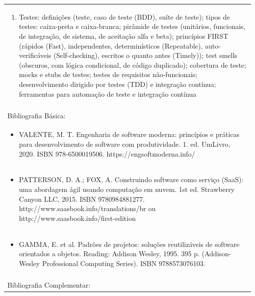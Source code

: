 \documentclass[11pt]{article}
\begin{document}
\begin{center}
\begin{longtable}{|p{4cm}|p{4cm}|p{4cm}|p{4cm}|}
\multicolumn{4}{|p{\dimexpr 16cm + 6\tabcolsep\relax}|}{\begin{enumerate}[start=6]\item Testes: definições (teste, caso de teste (BDD), suíte de teste); tipos de testes: caixa-preta e caixa-branca; pirâmide de testes (unitários, funcionais, de integração, de sistema, de aceitação alfa e beta); princípios FIRST (rápidos (Fast), independentes, determinísticos (Repeatable), auto-verificáveis (Self-checking), escritos o quanto antes (Timely)); test smells (obscuros, com lógica condicional, de código duplicado); cobertura de teste; mocks e stubs de testes; testes de requisitos não-funcionais; desenvolvimento dirigido por testes (TDD) e integração contínua; ferramentas para automação de teste e integração contínua\end{enumerate}}\\
\multicolumn{4}{|p{\dimexpr 16cm + 6\tabcolsep\relax}|}{}\\
\hline
\multicolumn{4}{|p{16cm}|}{Bibliografia Básica:}\\*
\multicolumn{4}{|p{\dimexpr 16cm + 6\tabcolsep\relax}|}{\begin{itemize}\item VALENTE, M. T. Engenharia de software moderna: princípios e práticas para desenvolvimento de software com produtividade. 1. ed. UmLivro, 2020. ISBN 978-6500019506. https://engsoftmoderna.info/\end{itemize}}\\
\multicolumn{4}{|p{\dimexpr 16cm + 6\tabcolsep\relax}|}{\begin{itemize}\item PATTERSON, D. A.; FOX, A. Construindo software como serviço (SaaS): uma abordagem ágil usando computação em nuvem. 1st ed. Strawberry Canyon LLC, 2015. ISBN 9780984881277. http://www.saasbook.info/translations/br ou http://www.saasbook.info/first-edition\end{itemize}}\\
\multicolumn{4}{|p{\dimexpr 16cm + 6\tabcolsep\relax}|}{\begin{itemize}\item GAMMA, E. et al. Padrões de projetos: soluções reutilizáveis de software orientados a objetos. Reading: Addison Wesley, 1995. 395 p. (Addison-Wesley Professional Computing Series). ISBN 9788573076103.\end{itemize}}\\
\multicolumn{4}{|p{16cm}|}{}\\
\hline
\multicolumn{4}{|p{16cm}|}{Bibliografia Complementar:}\\*

\end{longtable}
\end{center}
\end{document}
